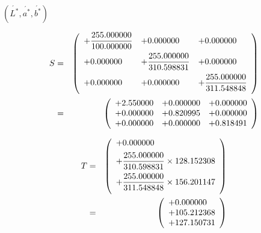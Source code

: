 \documentclass{article}
\begin{document}
$\left(\acute{L^{*}},\acute{a^{*}},\acute{b^{*}}\right)$
\pagebreak

\begin{eqnarray*} S &=& \left( \begin{array}{lll} +\dfrac{255.000000}{100.000000} & +0.000000 & +0.000000 \vspace{.5em} \\ +0.000000 & +\dfrac{255.000000}{310.598831} & +0.000000 \vspace{.5em} \\ +0.000000 & +0.000000 & +\dfrac{255.000000}{311.548848} \vspace{.5em} \\ \end{array} \right) \\ &=& \left( \begin{array}{lll} +2.550000 & +0.000000 & +0.000000 \\ +0.000000 & +0.820995 & +0.000000 \\ +0.000000 & +0.000000 & +0.818491 \\ \end{array} \right) \\ \end{eqnarray*}
\pagebreak

\begin{eqnarray*} T &=& \left( \begin{array}{l} +0.000000 \vspace{.5em} \\ +\dfrac{255.000000}{310.598831}\times 128.152308 \vspace{.5em} \\ +\dfrac{255.000000}{311.548848}\times 156.201147 \vspace{.5em} \\ \end{array} \right) \\ &=& \left( \begin{array}{l} +0.000000 \\ +105.212368 \\ +127.150731 \\ \end{array} \right) \\ \end{eqnarray*}
\pagebreak
\end{document}
